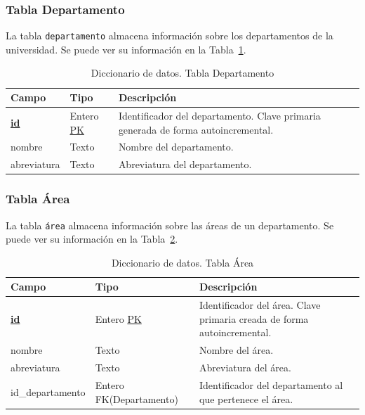 \subsubsection{Tabla Departamento}
La tabla \texttt{departamento} almacena información sobre los departamentos de la universidad. 
Se puede ver su información en la Tabla~\ref{tab:diccionario_departamento}.

\begin{table}
  \centering 
  \begin{tabular}{l p{} p{}}
    \toprule
    \textbf{Campo} & \textbf{Tipo} & \textbf{Descripción}\\
    \midrule
    \textbf{\underline{id}} & Entero \underline{PK} & Identificador del departamento. Clave primaria generada de forma autoincremental. \\ \addlinespace
    nombre & Texto & Nombre del departamento. \\ \addlinespace
    abreviatura & Texto & Abreviatura del departamento. \\
    \bottomrule
  \end{tabular}
  \caption{Diccionario de datos. Tabla Departamento}
  \label{tab:diccionario_departamento}
\end{table}

\subsubsection{Tabla Área}
La tabla \texttt{área} almacena información sobre las áreas de un departamento. 
Se puede ver su información en la Tabla~\ref{tab:diccionario_area}.

\begin{table}
  \centering 
  \begin{tabular}{l p{} p{}}
    \toprule
    \textbf{Campo} & \textbf{Tipo} & \textbf{Descripción}\\
    \midrule
    \textbf{\underline{id}} & Entero \underline{PK} & Identificador del área. Clave primaria creada de forma autoincremental. \\ \addlinespace
    nombre & Texto & Nombre del área. \\ \addlinespace
    abreviatura & Texto & Abreviatura del área. \\ \addlinespace
    id\_departamento & Entero FK(Departamento) & Identificador del departamento al que pertenece el área. \\
    \bottomrule
  \end{tabular}
  \caption{Diccionario de datos. Tabla Área}
  \label{tab:diccionario_area}
\end{table}

